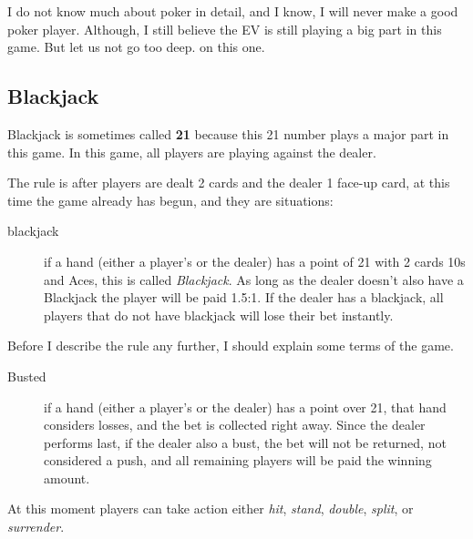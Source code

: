 \documentclass{article}
\begin{document}
I do not know much about poker in detail, and I know, I will never make a good poker player.  Although, I still believe the EV is still playing a big part in this game. But let us not go too deep. on this one.

\subsection{Blackjack}
Blackjack is sometimes called \textbf{21} because this 21 number plays a major part in this game.  In this game, all players are playing against the dealer.  

The rule is after players are dealt 2 cards and the dealer 1 face-up card, at this time the game already has begun, and they are situations:\\
\begin{description}
\item[blackjack] if a hand (either a player's or the dealer) has a point of 21 with 2 cards 10s and Aces, this is called \emph{Blackjack}.  As long as the dealer doesn't also have a Blackjack the player will be paid 1.5:1.  If the dealer has a blackjack, all players that do not have blackjack will lose their bet instantly.
\end{description}

Before I describe the rule any further, I should explain some terms of the game.\\

\begin{description}
\item[Busted] if a hand (either a player's or the dealer) has a point over 21, that hand considers losses, and the bet is collected right away.  Since the dealer performs last, if the dealer also a bust, the bet will not be returned, not considered a push, and all remaining players will be paid the winning amount.
\end{description}

At this moment players can take action either \emph{hit}, \emph{stand}, \emph{double}, \emph{split}, or \emph{surrender}.\\
\end{document}
